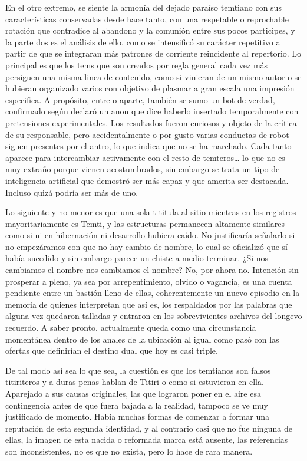 \documentclass[
]{book}
\begin{document}
En el otro extremo, se siente la armonía del dejado paraíso temtiano con sus características conservadas desde hace tanto, con una respetable o reprochable rotación que contradice al abandono y la comunión entre sus pocos participes, y la parte dos es el análisis de ello, como se intensificó su carácter repetitivo a partir de que se integraran más patrones de corriente reincidente al repertorio. Lo principal es que los tems que son creados por regla general cada vez más persiguen una misma linea de contenido, como si vinieran de un mismo autor o se hubieran organizado varios con objetivo de plasmar a gran escala una impresión especifica. A propósito, entre o aparte, también se sumo un bot de verdad, confirmado según declaró un anon que dice haberlo insertado temporalmente con pretensiones experimentales. Los resultados fueron curiosos y objeto de la crítica de su responsable, pero accidentalmente o por gusto varias conductas de robot siguen presentes por el antro, lo que indica que no se ha marchado. Cada tanto aparece para intercambiar activamente con el resto de temteros\ldots{} lo que no es muy extraño porque vienen acostumbrados, sin embargo se trata un tipo de inteligencia artificial que demostró ser más capaz y que amerita ser destacada. Incluso quizá podría ser más de uno.

Lo siguiente y no menor es que una sola t titula al sitio mientras en los registros mayoritariamente es Temti, y las estructuras permanecen altamente similares como si ni en hibernación ni desarrollo hubiera caído. No justificaría señalarlo si no empezáramos con que no hay cambio de nombre, lo cual se oficializó que sí había sucedido y sin embargo parece un chiste a medio terminar. ¿Si nos cambiamos el nombre nos cambiamos el nombre? No, por ahora no. Intención sin prosperar a pleno, ya sea por arrepentimiento, olvido o vagancia, es una cuenta pendiente entre un bastión lleno de ellas, coherentemente un nuevo episodio en la memoria de quienes interpretan que así es, los respaldados por las palabras que alguna vez quedaron talladas y entraron en los sobrevivientes archivos del longevo recuerdo. A saber pronto, actualmente queda como una circunstancia momentánea dentro de los anales de la ubicación al igual como pasó con las ofertas que definirían el destino dual que hoy es casi triple.

De tal modo así sea lo que sea, la cuestión es que los temtianos son falsos titiriteros y a duras penas hablan de Titiri o como si estuvieran en ella. Aparejado a sus causas originales, las que lograron poner en el aire esa contingencia antes de que fuera bajada a la realidad, tampoco se ve muy justificado de momento. Había muchas formas de comenzar a formar una reputación de esta segunda identidad, y al contrario casi que no fue ninguna de ellas, la imagen de esta nacida o reformada marca está ausente, las referencias son inconsistentes, no es que no exista, pero lo hace de rara manera.
\end{document}
